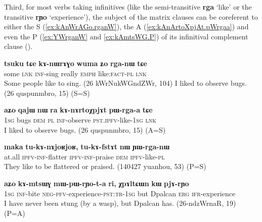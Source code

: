 \documentclass[oneside,a4paper,11pt]{article}
\newcommand{\ipa}[1]{\textbf{\phon#1}} %
\newcommand{\jpg}[2]{\ipa{#1} `#2'} %
\begin{document}
Third, for most verbs taking infinitives (like the semi-transitive \jpg{rga}{like} or the transitive \jpg{rɲo}{experience}), the subject of the matrix clauses can be coreferent to either the S  (\ref{ex:kAnWrAGo.rganW}), the A (\ref{ex:kAnArtoXpjAt.pWrgaa}) and even the P (\ref{ex:YWrganW} and \ref{ex:kAmtsWG.P})  of its infinitival complement clause (\citealt{jacques16relatives}).

 \begin{exe}
   \ex   \label{ex:kAnWrAGo.rganW} 
\gll
\ipa{tsuku}  	\ipa{tɕe}  	\ipa{kɤ-nɯrɤɣo}  	\ipa{wuma}  	\ipa{ʑo}  	\ipa{rga-nɯ}  	\ipa{tɕe}  \\
some \textsc{lnk} \textsc{inf}-sing really \textsc{emph} like:\textsc{fact-pl}  \textsc{lnk} \\
  \glt Some people like to sing. (26 kWrNukWGndZWr, 104) 
 \glt I liked to observe bugs. (26 quspunmbro, 15) (S=S)
     \end{exe}  
 
   \begin{exe}
   \ex   \label{ex:kAnArtoXpjAt.pWrgaa} 
\gll
  	\ipa{aʑo}  	\ipa{qajɯ}  	\ipa{nɯ} \ipa{ra}  	\ipa{kɤ-nɤrtoχpjɤt}  	\ipa{pɯ-rga-a}  	\ipa{tɕe}  	\\
  	\textsc{1sg} bugs \textsc{dem} \textsc{pl} \textsc{inf}-observe \textsc{pst.ipfv}-like-\textsc{1sg} \textsc{lnk}  \\
 \glt I liked to observe bugs. (26 quspunmbro, 15) (A=S)
     \end{exe}  
 
  \begin{exe}
   \ex   \label{ex:YWrganW} 
\gll
\ipa{maka}  	\ipa{tu-kɤ-nɤjoʁjoʁ,}  	\ipa{tu-kɤ-fstɤt}  	\ipa{nɯ}  	\ipa{ɲɯ-rga-nɯ}  \\
at.all \textsc{ipfv-inf}-flatter \textsc{ipfv-inf}-praise \textsc{dem} \textsc{ipfv}-like-\textsc{pl} \\
\glt They like to be flattered or praised. (140427 yuanhou, 53) (P=S)
    \end{exe}  
      \begin{exe}
   \ex   \label{ex:kAmtsWG.P} 
\gll 
\ipa{aʑo} 	\ipa{kɤ-mtsɯɣ} 	\ipa{mɯ-pɯ-rɲo-t-a} 	\ipa{ri,} 	\ipa{χpɤltɕɯn} 	\ipa{kɯ} 	\ipa{pjɤ-rɲo} 	
 \\
\textsc{1sg} \textsc{inf}-bite \textsc{neg-pfv}-experience-\textsc{pst:tr-1sg} but Dpalcan \textsc{erg} \textsc{ifr}-experience \\
\glt I have never been stung (by a wasp), but Dpalcan has. (26-ndzWrnaR, 19) (P=A)
    \end{exe}  
\end{document}
